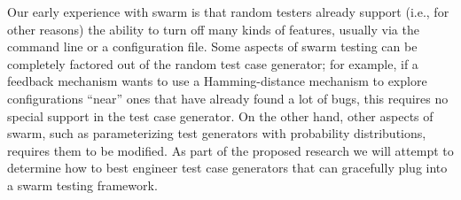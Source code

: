 Our early experience with swarm is that random testers already support
(i.e., for other reasons) the ability to turn off many kinds of
features, usually via the command line or a configuration file.
%
Some aspects of swarm testing can be completely factored out of the
random test case generator; for example, if a feedback mechanism wants
to use a Hamming-distance mechanism to explore configurations ``near''
ones that have already found a lot of bugs, this requires no special
support in the test case generator.
%
On the other hand, other aspects of swarm, such as parameterizing test
generators with probability distributions, requires them to be
modified.
%
As part of the proposed research we will attempt to determine how to
best engineer test case generators that can gracefully plug into a
swarm testing framework.





